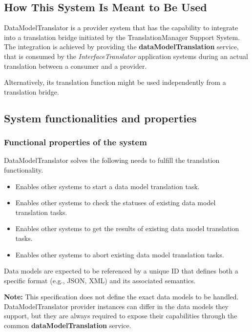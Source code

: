 \documentclass[a4paper]{arrowhead}
\begin{document}
\subsection{How This System Is Meant to Be Used}
\label{sec:use}

DataModelTranslator is a provider system that has the capability to integrate into a translation bridge initiated by the TranslationManager Support System. The integration is achieved by providing the \textbf{dataModelTranslation} service, that is consumed by the \textit{InterfaceTranslator} application systems during an actual translation between a consumer and a provider. 

Alternatively, its translation function might be used independently from a translation bridge. 

\subsection{System functionalities and properties}
\label{sec:properties}

\subsubsection {Functional properties of the system}
DataModelTranslator solves the following needs to fulfill the translation functionality.

\begin{itemize}
    \item Enables other systems to start a data model translation task.
    \item Enables other systems to check the statuses of existing data model translation tasks.
    \item Enables other systems to get the results of existing data model translation tasks.
    \item Enables other systems to abort existing data model translation tasks.
\end{itemize}

Data models are expected to be referenced by a unique ID that defines both a specific format (e.g., JSON, XML) and its associated semantics.

\textbf{Note:} This specification does not define the exact data models to be handled. DataModelTranslator provider instances can differ in the data models they support, but they are always required to expose their capabilities through the common \textbf{dataModelTranslation} service.
\end{document}
